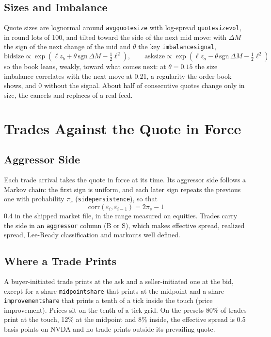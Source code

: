 \documentclass[11pt,a4paper]{article}
\newcommand{\key}[1]{\texttt{#1}}
\theoremstyle{paper}
\begin{document}
\subsection{Sizes and Imbalance}

Quote sizes are lognormal around \key{avgquotesize} with log-spread \key{quotesizevol}, in round lots of 100, and tilted toward the side of the next mid move: with $\Delta M$ the sign of the next change of the mid and $\theta$ the key \key{imbalancesignal},
\begin{equation}
\text{bidsize}\propto\exp\!\left(\ell z_b+\theta\,\text{sgn}\,\Delta M-\tfrac12\ell^2\right),\qquad
\text{asksize}\propto\exp\!\left(\ell z_a-\theta\,\text{sgn}\,\Delta M-\tfrac12\ell^2\right)
\end{equation}
so the book leans, weakly, toward what comes next: at $\theta=0.15$ the size imbalance correlates with the next move at 0.21, a regularity the order book shows, and 0 without the signal. About half of consecutive quotes change only in size, the cancels and replaces of a real feed.

\section{Trades Against the Quote in Force}\label{sec:trades}

\subsection{Aggressor Side}

Each trade arrival takes the quote in force at its time. Its aggressor side follows a Markov chain: the first sign is uniform, and each later sign repeats the previous one with probability $\pi_s$ (\key{sidepersistence}), so that
\begin{equation}
\text{corr}(\varepsilon_i,\varepsilon_{i-1})=2\pi_s-1
\end{equation}
0.4 in the shipped market file, in the range measured on equities. Trades carry the side in an \key{aggressor} column (B or S), which makes effective spread, realized spread, Lee-Ready classification and markouts well defined.

\subsection{Where a Trade Prints}

A buyer-initiated trade prints at the ask and a seller-initiated one at the bid, except for a share \key{midpointshare} that prints at the midpoint and a share \key{improvementshare} that prints a tenth of a tick inside the touch (price improvement). Prices sit on the tenth-of-a-tick grid. On the presets 80\% of trades print at the touch, 12\% at the midpoint and 8\% inside, the effective spread is 0.5 basis points on NVDA and no trade prints outside its prevailing quote.
\end{document}
